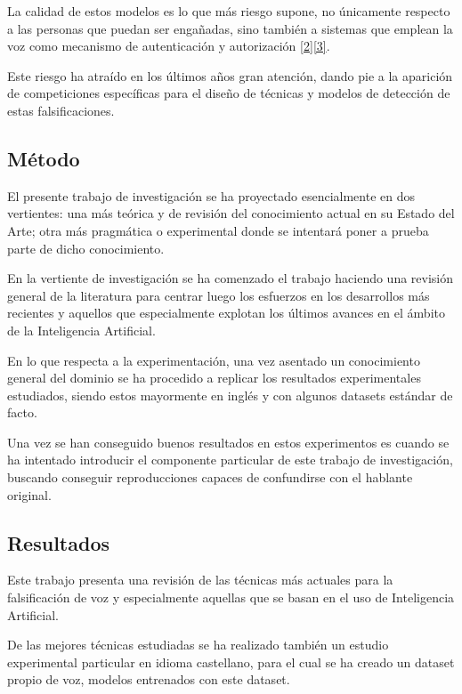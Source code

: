 La calidad de estos modelos es lo que más riesgo supone, no únicamente respecto a las personas que puedan ser engañadas, sino también a sistemas que emplean la voz como mecanismo de autenticación y autorización \hyperref[RI_2]{[2]}\hyperref[RI_3]{[3]}. 

Este riesgo ha atraído en los últimos años gran atención, dando pie a la aparición de competiciones específicas para el diseño de técnicas y modelos de detección de estas falsificaciones.

\subsection{Método}

El presente trabajo de investigación se ha proyectado esencialmente en dos vertientes: una más teórica y de revisión del conocimiento actual en su Estado del Arte; otra más pragmática o experimental donde se intentará poner a prueba parte de dicho conocimiento.

En la vertiente de investigación se ha comenzado el trabajo haciendo una revisión general de la literatura para centrar luego los esfuerzos en los desarrollos más recientes y aquellos que especialmente explotan los últimos avances en el ámbito de la Inteligencia Artificial.

En lo que respecta a la experimentación, una vez asentado un conocimiento general del dominio se ha procedido a replicar los resultados experimentales estudiados, siendo estos mayormente en inglés y con algunos datasets estándar de facto. 

Una vez se han conseguido buenos resultados en estos experimentos es cuando se ha intentado introducir el componente particular de este trabajo de investigación, buscando conseguir reproducciones capaces de confundirse con el hablante original.

\subsection{Resultados}

Este trabajo presenta una revisión de las técnicas más actuales para la falsificación de voz y especialmente aquellas que se basan en el uso de Inteligencia Artificial.

De las mejores técnicas estudiadas se ha realizado también un estudio experimental particular en idioma castellano, para el cual se ha creado un dataset propio de voz, modelos entrenados con este dataset.

